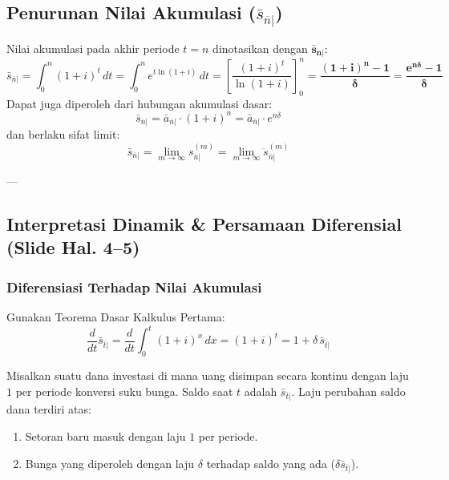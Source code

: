 \documentclass[11pt,a4paper]{article}
\begin{document}
\subsection{Penurunan Nilai Akumulasi (\texorpdfstring{$\bar{s}_{\overline{n}|}$}{s_bar_n})}

Nilai akumulasi pada akhir periode $t = n$ dinotasikan dengan $\mathbf{\bar{s}_{\overline{n}|}}$:
\begin{equation}
    \bar{s}_{\overline{n}|} = \int_0^n (1+i)^t \, dt = \int_0^n e^{t \ln(1+i)} \, dt = \left[ \frac{(1+i)^t}{\ln(1+i)} \right]_0^n = \mathbf{\frac{(1+i)^n - 1}{\delta} = \frac{e^{n\delta} - 1}{\delta}}
\end{equation}
Dapat juga diperoleh dari hubungan akumulasi dasar:
\begin{equation}
    \bar{s}_{\overline{n}|} = \bar{a}_{\overline{n}|} \cdot (1+i)^n = \bar{a}_{\overline{n}|} \cdot e^{n\delta}
\end{equation}
dan berlaku sifat limit:
\begin{equation}
    \bar{s}_{\overline{n}|} = \lim_{m \to \infty} s_{\overline{n}|}^{(m)} = \lim_{m \to \infty} \ddot{s}_{\overline{n}|}^{(m)}
\end{equation}

---

\subsection{Interpretasi Dinamik \& Persamaan Diferensial (Slide Hal. 4--5)}

\subsubsection{Diferensiasi Terhadap Nilai Akumulasi}
Gunakan Teorema Dasar Kalkulus Pertama:
\begin{equation}
    \frac{d}{dt} \bar{s}_{\overline{t}|} = \frac{d}{dt} \int_0^t (1+i)^x \, dx = (1+i)^t = 1 + \delta \, \bar{s}_{\overline{t}|}
\end{equation}

\begin{notebox}
Misalkan suatu dana investasi di mana uang disimpan secara kontinu dengan laju $1$ per periode konversi suku bunga. Saldo saat $t$ adalah $\bar{s}_{\overline{t}|}$. Laju perubahan saldo dana terdiri atas:
\begin{enumerate}
    \item Setoran baru masuk dengan laju $1$ per periode.
    \item Bunga yang diperoleh dengan laju $\delta$ terhadap saldo yang ada ($\delta \bar{s}_{\overline{t}|}$).
\end{enumerate}
\end{notebox}
\end{document}
